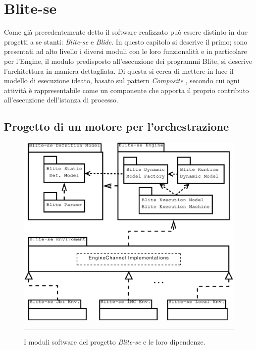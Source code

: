 \chapter{Blite-se}

Come già precedentemente detto il software realizzato può essere distinto in due
progetti a se stanti: \emph{Blite-se} e \emph{Blide}. In questo capitolo si
descrive il primo; sono presentati ad alto livello i diversi moduli con le loro
funzionalità e in particolare per l'Engine, il modulo predisposto all'esecuzione
dei programmi Blite, si descrive l'architettura in maniera dettagliata. Di questa
si cerca di mettere in luce il modello di esecuzione ideato, basato sul pattern
\emph{Composite} \cite{GANGo4}, secondo cui ogni attività è rappresentabile come
un componente che apporta il proprio contributo all'esecuzione dell'istanza di
processo.

\section{Progetto di un motore per l'orchestrazione}

\label{sec:progmot}
\begin{figure}[t]
\begin{center}
\includegraphics[scale=0.50]
{architettura_interna/dia/BliteModule}
\caption[I moduli di Blite-se] {I moduli software del progetto \emph{Blite-se}
e le loro dipendenze.}
\rule{7cm}{0.01cm}
  \label{fig:modules}
\end{center}
\end{figure}

